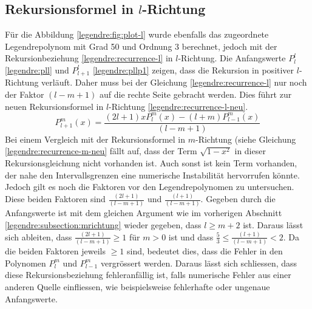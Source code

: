 \subsection{Rekursionsformel in $l$-Richtung
\label{legendre:subsection:lrichtung}}
Für die Abbildung \ref{legendre:fig:plot-l} wurde ebenfalls das zugeordnete Legendrepolynom mit Grad 50 und Ordnung 3 berechnet, jedoch mit der Rekursionbeziehung \eqref{legendre:recurrence-l} in $l$-Richtung.
Die Anfangswerte $P^{l}_{l}$ \eqref{legendre:pll} und $P^{l}_{l+1}$ \eqref{legendre:pllp1} zeigen, dass die Rekursion in positiver $l$-Richtung verläuft.
Daher muss bei der Gleichung \eqref{legendre:recurrence-l} nur noch der Faktor $(l-m+1)$ auf die rechte Seite gebracht werden.
Dies führt zur neuen Rekursionsformel in $l$-Richtung \eqref{legendre:recurrence-l-neu}.
\begin{equation}
P^{m}_{l+1}(x)
= \frac{(2l+1)xP^{m}_{l}(x)-(l+m)P^{m}_{l-1}(x)}{(l-m+1)} 
\label{legendre:recurrence-l-neu}
\end{equation}
Bei einem Vergleich mit der Rekursionsformel in $m$-Richtung (siehe Gleichung \eqref{legendre:recurrence-m-neu} fällt auf, dass der Term $\sqrt{1-x^2}$ in dieser Rekursionsgleichung nicht vorhanden ist.
Auch sonst ist kein Term vorhanden, der nahe den Intervallsgrenzen eine numerische Instabilität hervorrufen könnte.
Jedoch gilt es noch die Faktoren vor den Legendrepolynomen zu untersuchen.
Diese beiden Faktoren sind $\frac{(2l+1)}{(l-m+1)}$ und $\frac{(l+1)}{(l-m+1)}$.
Gegeben durch die Anfangswerte ist mit dem gleichen Argument wie im vorherigen Abschnitt \ref{legendre:subsection:mrichtung} wieder gegeben, dass $l\geq m+2$ ist.
Daraus lässt sich ableiten, dass $\frac{(2l+1)}{(l-m+1)}\geq 1$ für $m>0$ ist und dass $\frac{5}{3}\leq \frac{(l+1)}{(l-m+1)}<2$.
Da die beiden Faktoren jeweils $\geq 1$ sind, bedeutet dies, dass die Fehler in den Polynomen $P^{m}_{l}$ und $P^{m}_{l-1}$ vergrössert werden.
Daraus lässt sich schliessen, dass diese Rekursionsbeziehung fehleranfällig ist, falls numerische Fehler aus einer anderen Quelle einfliessen, wie beispielsweise fehlerhafte oder ungenaue Anfangswerte.

